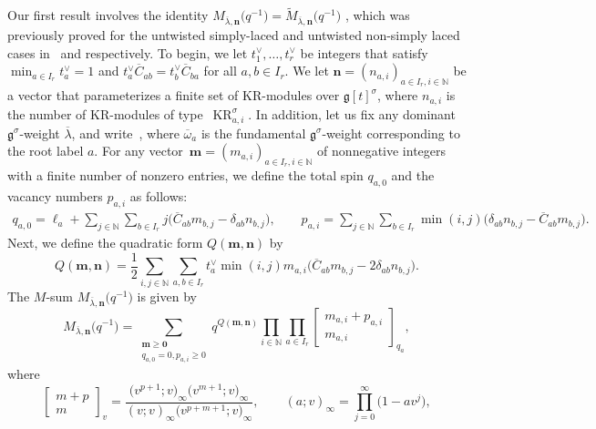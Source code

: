 \documentclass[pdftex]{sigma}
\numberwithin{equation}{section}
\DeclareMathOperator{\KR}{KR}
\begin{document}
Our first result involves the identity $M_{\overline{\lambda},\mathbf{n}}\bigl(q^{-1}\bigr)=\tilde{M}_{\overline{\lambda},\mathbf{n}}\bigl(q^{-1}\bigr)$ \cite[Conjecture~4.3]{HKOTT02}, which was previously proved for the untwisted simply-laced and untwisted non-simply laced cases in~\cite[Theorem~5.1]{DFK14} and \cite[Theorem~1.2]{Lin21} respectively. To begin, we let $t_1^{\vee},\dots,t_r^{\vee}$ be integers that satisfy~${\min_{a\in I_r}t_a^{\vee}=1}$ and $t_a^{\vee}\overline{C}_{ab}= t_b^{\vee}\overline{C}_{ba}$ for all $a,b\in I_r$. We let $\mathbf{n}=(n_{a,i})_{a\in I_r,i\in\mathbb{N}}$ be a vector that parameterizes a finite set of KR-modules over $\mathfrak{g}[t]^{\sigma}$, where $n_{a,i}$ is the number of KR-modules of type~$\KR_{a,i}^{\sigma}$. In addition, let us fix any dominant $\mathfrak{g}^{\sigma}$-weight $\overline{\lambda}$, and write~, where $\overline{\omega}_a$ is the fundamental $\mathfrak{g}^{\sigma}$-weight corresponding to the root label $a$. For any vector~${\mathbf{m}=(m_{a,i})_{a\in I_r,i\in\mathbb{N}}}$ of nonnegative integers with a finite number of nonzero entries, we define the total spin $q_{a,0}$ and the vacancy numbers $p_{a,i}$ as follows:
\begin{gather*}
q_{a,0}=\ell_a+\sum_{j\in\mathbb{N}}\sum_{b\in I_r}j\bigl(\overline{C}_{ab}m_{b,j}-\delta_{ab}n_{b,j}\bigr),\qquad
p_{a,i}=\sum_{j\in\mathbb{N}}\sum_{b\in I_r}\min(i,j)\bigl(\delta_{ab}n_{b,j}-\overline{C}_{ab}m_{b,j}\bigr).
\end{gather*}
Next, we define the quadratic form $Q(\mathbf{m},\mathbf{n})$ by
\[
Q(\mathbf{m},\mathbf{n})=\frac{1}{2}
\sum_{i,j\in\mathbb{N}}\sum_{a,b\in I_r}
t_a^{\vee}\min(i,j)m_{a,i}\bigl(\overline{C}_{ab}m_{b,j}-2\delta_{ab}n_{b,j}\bigr).
\]
The $M$-sum $M_{\overline{\lambda},\mathbf{n}}\bigl(q^{-1}\bigr)$ is given by \cite[equation~(4.5)]{HKOTT02}
\begin{equation}\label{eq:1.5}
M_{\overline{\lambda},\mathbf{n}}\bigl(q^{-1}\bigr)
=\sum_{\substack{\mathbf{m}\geq\mathbf{0}\\q_{a,0}=0,p_{a,i}\geq0}}q^{Q(\mathbf{m},\mathbf{n})}\prod_{i\in\mathbb{N}}\prod_{a\in I_r}
\begin{bmatrix}m_{a,i}+p_{a,i}\\m_{a,i}\end{bmatrix}_{q_a},
\end{equation}
where
\begin{equation*}
\begin{bmatrix}m+p\\m\end{bmatrix}_v=\frac{\bigl(v^{p+1};v\bigr)_{\infty}\bigl(v^{m+1};v\bigr)_{\infty}}{(v;v)_{\infty}\bigl(v^{p+m+1};v\bigr)_{\infty}},\qquad (a;v)_{\infty}=\prod_{j=0}^{\infty}\bigl(1-av^j\bigr),
\end{equation*}
\end{document}
